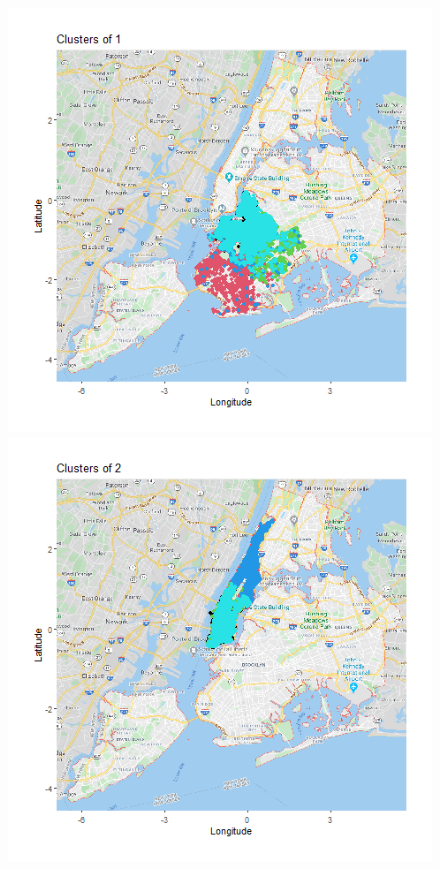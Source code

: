 \documentclass{FR16}
\begin{document}
\begin{figure}[!htb]
   \begin{minipage}{0.33\textwidth}
     \centering
     \includegraphics[width=1\linewidth]{figures/clust-1.png} 
   \end{minipage}\hfill
   \begin{minipage}{0.33\textwidth}
     \centering
     \includegraphics[width=1\linewidth]{figures/clust-2.png}

\end{minipage}
\end{figure}
\end{document}
